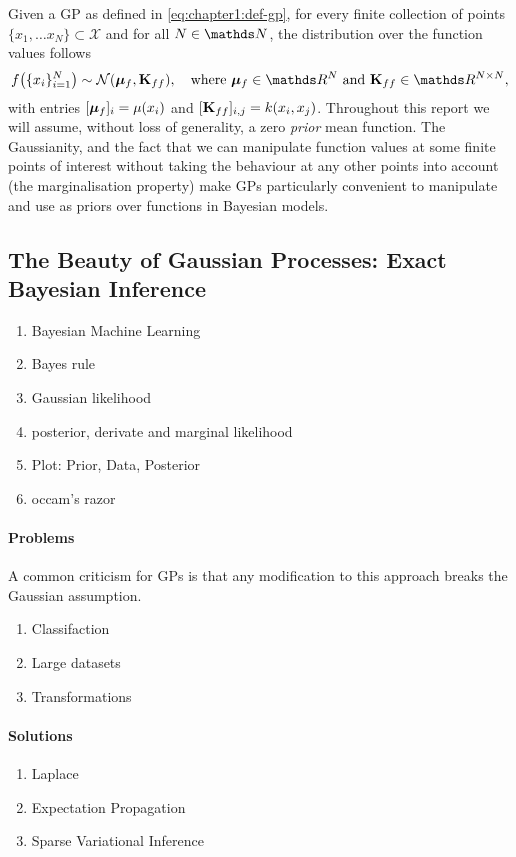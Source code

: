 Given a GP as defined in \cref{eq:chapter1:def-gp}, for every finite collection of points $\{x_1, \ldots x_N\} \subset \mathcal{X}$ and for all $N \in \Naturals$, the distribution over the function values follows
\begin{equation}
f\big(\{x_i\}_{i=1}^N\big) \sim \NormDist{\vmu_f, \MK_{ff}},\quad\text{where}\ \vmu_f \in \Reals^N\text{ and }\MK_{ff} \in \Reals^{N \times N},
\end{equation}
with entries $[\boldsymbol{\mu}_f]_i = \mu(x_i)$ and $[\mathbf{{K}}_{ff}]_{i,j} = k(x_i, x_j)$. Throughout this report we will assume, without loss of generality, a zero \emph{prior} mean function. The Gaussianity, and the fact that we can manipulate function values at some finite points of interest without taking the behaviour at any other points into account (the marginalisation property) make GPs particularly convenient to manipulate and use as priors over functions in Bayesian models.

\subsection{The Beauty of Gaussian Processes: Exact Bayesian Inference}

\begin{enumerate}
  \item Bayesian Machine Learning
  \item Bayes rule
  \item Gaussian likelihood
  \item posterior, derivate and marginal likelihood
  \item Plot: Prior, Data, Posterior
  \item occam's razor
\end{enumerate}

\paragraph{Problems}
A common criticism for GPs is that any modification to this approach breaks the Gaussian assumption. 
\begin{enumerate}
  \item Classifaction
  \item Large datasets
  \item Transformations
\end{enumerate}

\paragraph{Solutions}
\begin{enumerate}
  \item Laplace
  \item Expectation Propagation
  \item Sparse Variational Inference
\end{enumerate}


